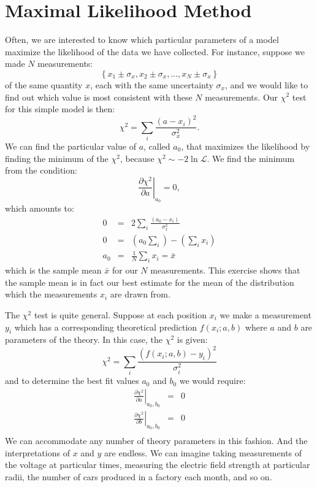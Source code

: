 \documentclass[12pt,oneside]{book}
\begin{document}
\section{Maximal Likelihood Method}
Often, we are interested to know which particular parameters of a model maximize the likelihood
of the data we have collected.  For instance, suppose we made $N$ measurements:
\begin{displaymath}
\left\{ x_1 \pm \sigma_x, x_2 \pm \sigma_x, ..., x_N \pm \sigma_x \right\}
\end{displaymath}
of the same quantity $x$, each with the same uncertainty $\sigma_x$, and we
would like to find out which value is most consistent with
these $N$ measurements.  Our $\chi^2$ test for this simple model is
then:
\begin{displaymath}
\chi^2 = \sum_i \frac{(a - x_i)^2}{\sigma_x^2}.
\end{displaymath}
We can find the particular value of $a$, called $a_0$, that maximizes
the likelihood by finding the minimum of the $\chi^2$, because $\chi^2
\sim - 2 \ln \mathcal{L}$.  We find the minimum from the condition:
\begin{displaymath}
\left.\frac{\partial\chi^2}{\partial a}\right|_{a_0} = 0,
\end{displaymath}
which amounts to:
\begin{eqnarray}
0 &=& 2 \sum_i \frac{(a_0 - x_i)}{\sigma_x^2} \nonumber \\
0 &=& \left( a_0 \sum_i \right)- \left( \sum_i x_i \right) \nonumber \\
a_0 &=& \frac{1}{N} \sum_i x_i \label{eqn:mean} = \bar{x}
\end{eqnarray}
which is the sample mean $\bar{x}$ for our $N$ measurements.  This
exercise shows that the sample mean is in fact our best estimate for
the mean of the distribution which the measurements $x_i$ are drawn from.

The $\chi^2$ test is quite general.  Suppose at each position
$x_i$ we make a measurement $y_i$ which has a corresponding
theoretical prediction $f(x_i; a, b)$ where $a$ and $b$ are parameters
of the theory.  In this case, the $\chi^2$ is given:
\begin{displaymath}
\chi^2 = \sum_i \frac{(f(x_i;a,b) - y_i)^2}{\sigma_i^2}
\end{displaymath}
and to determine the best fit values $a_0$ and $b_0$ we would require:
\begin{eqnarray*}
  \left.\frac{\partial\chi^2}{\partial a}\right|_{a_0,b_0} &=& 0 \\
  \left.\frac{\partial\chi^2}{\partial b}\right|_{a_0,b_0} &=& 0 \\
\end{eqnarray*}
We can accommodate any number of theory parameters in this fashion.
And the interpretations of $x$ and $y$ are endless.  We can imagine
taking measurements of the voltage at particular times, measuring the
electric field strength at particular radii, the number of cars
produced in a factory each month, and so on.
\end{document}
